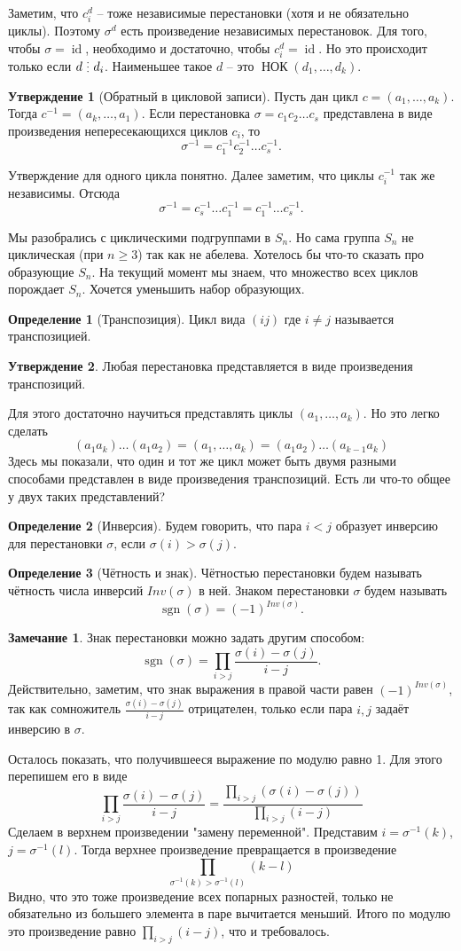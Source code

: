 \documentclass[10pt,a4paper,oneside]{book}
\theoremstyle{definition}
\newtheorem*{rem}{\color{green!50!blue}Замечание}
\newtheorem*{defn}{\color{yellow!30!red} Определение}
\newtheorem{utvr}{\color{blue!50!black}Утверждение}
\renewcommand{\geq}{\geqslant}
\newcommand{\id}{\operatorname{id}}
\newcommand{\di}{\mathop{\,\scalebox{0.85}{\raisebox{-1.2pt}[0.5\height]{\vdots}}\,}}
\newcommand{\Nok}{\operatorname{\text{НОК}}}
\newcommand{\sgn}{\operatorname{sgn}}
\def\dfn{\begin{defn}}
\def\edfn{\end{defn}}
\def\rm{\begin{rem}}
\def\erm{\end{rem}}
\def\utv{\begin{utvr}}
\def\eutv{\end{utvr}}
\begin{document}
Заметим, что $c_i^d$ -- тоже независимые перестановки (хотя и не обязательно циклы). Поэтому $\sigma^d$  есть произведение независимых перестановок. Для того, чтобы $\sigma =\id$, необходимо и достаточно, чтобы $c_i^d=\id$. Но это происходит только если $d\di d_i$. Наименьшее такое $d$ -- это $\Nok(d_1,\dots,d_k)$.
\endproof

\utv[Обратный в цикловой записи] Пусть дан цикл $c=(a_1,\dots,a_k)$. Тогда $c^{-1}=(a_k,\dots,a_1)$. Если перестановка   $\sigma= c_1c_2\dots c_s$ представлена в виде произведения непересекающихся циклов $c_i$, то
$$\sigma^{-1}=c_1^{-1}c_2^{-1}\dots c_s^{-1}.$$
\eutv
\proof Утверждение для одного цикла понятно. Далее заметим, что циклы $c_i^{-1}$ так же независимы. Отсюда
$$\sigma^{-1}=c_s^{-1}\dots c_1^{-1}=c_1^{-1}\dots c_s^{-1}.$$
\endproof



Мы разобрались с циклическими подгруппами в $ S_n$. Но сама группа $S_n$ не циклическая (при $n\geq 3$) так как не абелева. Хотелось бы что-то сказать про образующие $S_n$. На текущий момент мы знаем, что множество всех циклов порождает $S_n$. Хочется уменьшить набор образующих.

\dfn[Транспозиция] Цикл вида $(ij)$ где $i\neq j$ называется транспозицией.
\edfn

\utv Любая перестановка представляется в виде произведения транспозиций.
\eutv
\proof Для этого достаточно научиться представлять циклы $(a_1,\dots,a_k)$. Но это легко сделать
$$(a_1 a_k)\dots( a_1 a_2)=(a_1,\dots,a_k)=(a_1a_2)\dots (a_{k-1} a_k)$$
\endproof
Здесь мы показали, что один и тот же цикл может быть двумя разными способами представлен в виде произведения транспозиций. Есть ли что-то общее у двух таких представлений?

\dfn[Инверсия] Будем говорить, что пара $i<j$  образует инверсию для перестановки $\sigma$, если $\sigma(i)>\sigma(j)$.
\edfn

\dfn[Чётность и знак] Чётностью перестановки будем называть чётность числа инверсий $Inv(\sigma)$ в ней. Знаком перестановки $\sigma$ будем называть 
$$\sgn(\sigma)=(-1)^{Inv(\sigma)}.$$
\edfn

\rm Знак перестановки можно задать другим способом: 
$$\sgn(\sigma)= \prod_{i>j} \frac{\sigma(i)-\sigma(j)}{i-j}.$$
Действительно, заметим, что знак выражения в правой части равен $(-1)^{Inv (\sigma)}$, так как сомножитель $\frac{\sigma(i)-\sigma(j)}{i-j}$ отрицателен, только если пара $i,j$ задаёт инверсию в $\sigma$.

Осталось показать, что получившееся выражение по модулю равно 1. Для этого перепишем его в виде 
$$\prod_{i>j} \frac{\sigma(i)-\sigma(j)}{i-j}= \frac{\prod_{i>j} (\sigma(i)-\sigma(j))}{\prod_{i>j}(i-j)}
$$
Сделаем в верхнем произведении "замену переменной". Представим $i=\sigma^{-1}(k)$, $j=\sigma^{-1}(l)$. Тогда верхнее произведение превращается в произведение 
$$\prod_{\sigma^{-1}(k)>\sigma^{-1}(l)} (k-l)$$
Видно, что это тоже произведение всех попарных разностей, только не обязательно из большего элемента в паре вычитается меньший. Итого по модулю это произведение равно $\prod_{i>j}(i-j)$, что  и требовалось.
\erm
\end{document}
